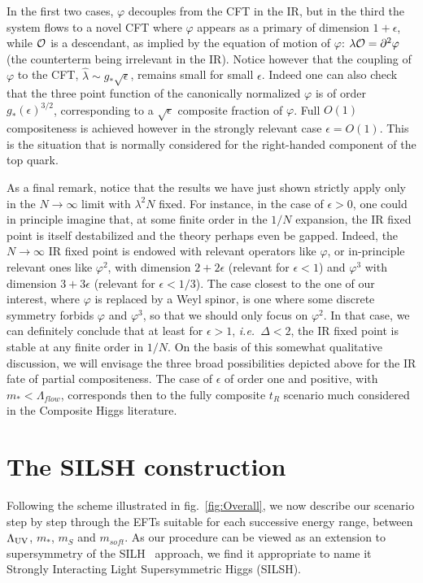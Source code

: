 \documentclass[a4paper,12pt]{article}
\def\fig#1{fig.~\ref{#1}}
\def\fig#1{fig.~\ref{#1}}
\def\LUV{\Lambda_{\rm UV}}
\def\mst{m_*}
\def\mS{m_S}
\def\hlambda{\hat\lambda}
\begin{document}
In the first two cases, $\varphi$ decouples from the CFT in the IR, but in the third the system flows to a novel CFT where $\varphi$ appears as a primary of dimension $1+\epsilon$, while $\cal O $ is a descendant, as implied by the equation of motion of $\varphi$: $\lambda {\cal O}=\partial^2\varphi$ (the counterterm being irrelevant in the IR). Notice however that the coupling of $\varphi$ to the CFT, $\hlambda\sim g_*\sqrt \epsilon$, remains small for small $\epsilon$. Indeed one can also check that the three point function of the canonically normalized $\varphi$ is of order
$g_*(\epsilon)^{3/2}$, corresponding to a $\sqrt \epsilon$ composite fraction of $\varphi$. Full $O(1)$ compositeness is achieved however in the strongly relevant case $\epsilon =O(1)$. This is the situation that is normally considered for the right-handed component of the top quark.

As a final remark, notice that the results we have just shown strictly apply only in the $N\to \infty$ limit with $\lambda^2N$ fixed. For instance, in the case of $\epsilon>0$, one could in principle imagine that, at some finite order in the $1/N$ expansion, the IR fixed point is itself destabilized and the theory perhaps even be gapped. Indeed, the $N\to \infty$ IR fixed point is endowed with relevant operators like $\varphi$, or in-principle relevant ones like $\varphi^2$, with dimension $2+2\epsilon$ (relevant for $\epsilon<1$) and $\varphi^3$ with dimension $3+3\epsilon$ (relevant for $\epsilon < 1/3$). The case closest to the one of our interest, where $\varphi$ is replaced by a Weyl spinor, is one where some discrete symmetry forbids $\varphi$ and $\varphi^3$, so that we should only focus on $\varphi^2$. In that case, we can definitely conclude that at least for $\epsilon >1$, {\it i.e.}~$\Delta <2$, the IR fixed point is stable at any finite order in $1/N$.
On the basis of this somewhat qualitative discussion, we will envisage the three broad possibilities depicted above for the IR fate of partial compositeness. The  case of $\epsilon$ of order one and positive, with $\mst< \Lambda_{flow}$, corresponds then to the fully composite $t_R$ scenario much considered in the Composite Higgs literature.

\boldmath
\section{The SILSH construction}
\unboldmath
\label{sec:SILSH}

Following  the scheme illustrated in \fig{fig:Overall}, we  now describe our scenario step by step through the EFTs suitable for each successive energy range, between $\LUV$, $\mst$, $\mS$ and $m_{soft}$. As our procedure can be viewed as an extension to supersymmetry of the SILH~\cite{Giudice:2007fh} approach,  we find it  appropriate to name  it  Strongly Interacting Light Supersymmetric Higgs (SILSH). 
\end{document}
